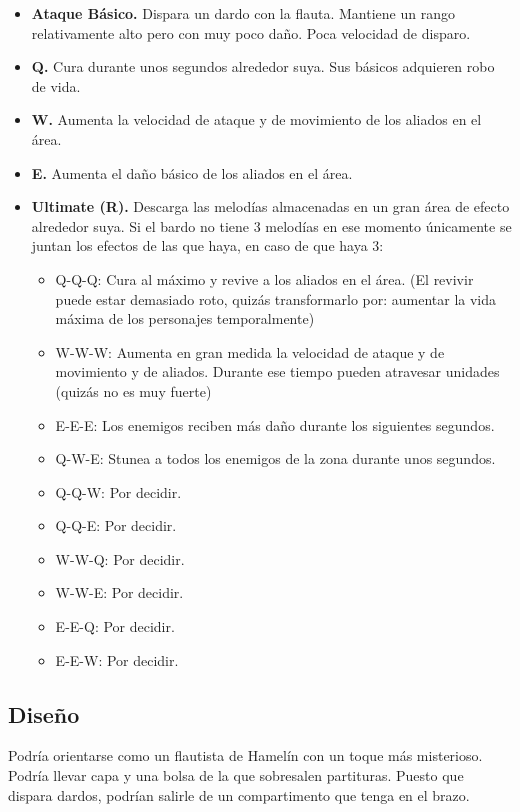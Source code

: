 \begin{itemize}
    \item \textbf{Ataque Básico.} Dispara un dardo con la flauta. Mantiene un rango relativamente alto pero con muy poco daño. Poca velocidad de disparo.
    \item \textbf{Q.} Cura durante unos segundos alrededor suya. Sus básicos adquieren robo de vida.
    \item \textbf{W.} Aumenta la velocidad de ataque y de movimiento de los aliados en el área.
    \item \textbf{E.} Aumenta el daño básico de los aliados en el área.
    \item \textbf{Ultimate (R).} Descarga las melodías almacenadas en un gran área de efecto alrededor suya. Si el bardo no tiene 3 melodías en ese momento únicamente se juntan los efectos de las que haya, en caso de que haya 3:
    \begin{itemize}
        \item Q-Q-Q: Cura al máximo y revive a los aliados en el área. (El revivir puede estar demasiado roto, quizás transformarlo por: aumentar la vida máxima de los personajes temporalmente)
        \item W-W-W: Aumenta en gran medida la velocidad de ataque y de movimiento y de aliados. Durante ese tiempo pueden atravesar unidades (quizás no es muy fuerte)
        \item E-E-E: Los enemigos reciben más daño durante los siguientes segundos.
        \item Q-W-E: Stunea a todos los enemigos de la zona durante unos segundos.
        \item Q-Q-W: Por decidir.
        \item Q-Q-E: Por decidir.
        \item W-W-Q: Por decidir.
        \item W-W-E: Por decidir.
        \item E-E-Q: Por decidir.
        \item E-E-W: Por decidir.
    \end{itemize}
\end{itemize}

\subsection{Diseño}
Podría orientarse como un flautista de Hamelín con un toque más misterioso. Podría llevar capa y una bolsa de la que sobresalen partituras. Puesto que dispara dardos, podrían salirle de un compartimento que tenga en el brazo.

